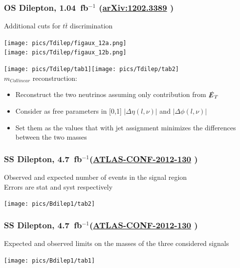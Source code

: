 \documentclass[xcolor=dvipsnames,10pt]{beamer}
\newcommand{\ifb}{~fb$^{-1}$}
\begin{document}
\begin{frame}[label=Tdilep]\frametitle{OS Dilepton, 1.04~fb$^{-1}$ ({\small \href{http://arxiv.org/abs/1202.3389}{arXiv:1202.3389} \cite{Aad:2012bt}})}
\footnotesize\centering


\begin{minipage}{.35\textwidth}
\centering

Additional cuts for $t\bar{t}$ discrimination
\vspace{\baselineskip}


\texttt{[image: pics/Tdilep/figaux\_12a.png]}\\
\texttt{[image: pics/Tdilep/figaux\_12b.png]}

\end{minipage}\begin{minipage}{.65\textwidth}
\centering
\texttt{[image: pics/Tdilep/tab1]}\texttt{[image: pics/Tdilep/tab2]}\\

$m_{Collinear}$ reconstruction:

\begin{itemize}
\item Reconstruct the two neutrinos assuming only contribution from $\slashed{E}_T$
\item Consider as free parameters in [0,1] $|\Delta\eta(l,\nu)|$ and $|\Delta\phi(l,\nu)|$
\item Set them as the values that with jet assignment minimizes the differences between the two masses
\end{itemize}
\end{minipage}


\end{frame}


\begin{frame}[label=Bdilep1]\frametitle{SS Dilepton, 4.7\ifb ({\small \href{https://cdsweb.cern.ch/record/1478217}{ATLAS-CONF-2012-130} \cite{ATLAS-CONF-2012-130}})}
\footnotesize\centering

Observed and expected number of events in the signal region\\
Errors are stat and syst respectively

\texttt{[image: pics/Bdilep1/tab2]}

\end{frame}


\begin{frame}\frametitle{SS Dilepton, 4.7\ifb ({\small \href{https://cdsweb.cern.ch/record/1478217}{ATLAS-CONF-2012-130} \cite{ATLAS-CONF-2012-130}})}
\footnotesize\centering

Expected and observed limits on the masses of the three considered signals

\texttt{[image: pics/Bdilep1/tab1]}

\end{frame}
\end{document}
